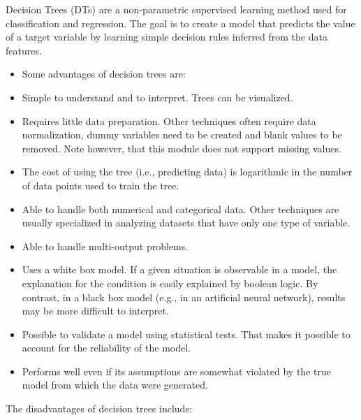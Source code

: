 Decision Trees (DTs) are a non-parametric supervised learning method used for
classification and regression.
%
The goal is to create a model that predicts the value of a target variable by
learning simple decision rules inferred from the data features.
%
\begin{itemize}
  \item Some advantages of decision trees are:
  \item Simple to understand and to interpret.
  Trees can be visualized.
  \item Requires little data preparation.
  Other techniques often require data normalization, dummy variables need to be
  created and blank values to be removed.
  Note however, that this module does not support missing values.
  \item The cost of using the tree (i.e., predicting data) is logarithmic in the
  number of data points used to train the tree.
  \item Able to handle both numerical and categorical data.
  Other techniques are usually specialized in analyzing datasets that have only
  one type of variable.
  \item Able to handle multi-output problems.
  \item Uses a white box model.
  If a given situation is observable in a model, the explanation for the
  condition is easily explained by boolean logic.
  By contrast, in a black box model (e.g., in an artificial neural network),
  results may be more difficult to interpret.
  \item Possible to validate a model using statistical tests.
  That makes it possible to account for the reliability of the model.
  \item Performs well even if its assumptions are somewhat violated by the true
  model from which the data were generated.
\end{itemize}
The disadvantages of decision trees include:
